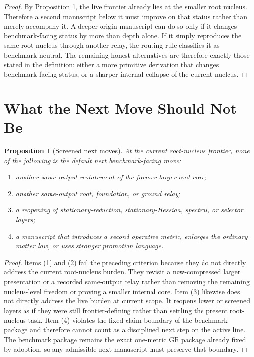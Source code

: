 \documentclass[11pt]{article}
\newtheorem{proposition}{Proposition}
\begin{document}
\begin{proof}
By Proposition 1, the live frontier already lies at the smaller root nucleus. Therefore a second manuscript below it must improve on that status rather than merely accompany it. A deeper-origin manuscript can do so only if it changes benchmark-facing status by more than depth alone. If it simply reproduces the same root nucleus through another relay, the routing rule classifies it as benchmark neutral. The remaining honest alternatives are therefore exactly those stated in the definition: either a more primitive derivation that changes benchmark-facing status, or a sharper internal collapse of the current nucleus.
\end{proof}

\section{What the Next Move Should Not Be}

\begin{proposition}[Screened next moves]
At the current root-nucleus frontier, none of the following is the default next benchmark-facing move:
\begin{enumerate}
    \item another same-output restatement of the former larger root core;
    \item another same-output root, foundation, or ground relay;
    \item a reopening of stationary-reduction, stationary-Hessian, spectral, or selector layers;
    \item a manuscript that introduces a second operative metric, enlarges the ordinary matter law, or uses stronger promotion language.
\end{enumerate}
\end{proposition}

\begin{proof}
Items (1) and (2) fail the preceding criterion because they do not directly address the current root-nucleus burden. They revisit a now-compressed larger presentation or a recorded same-output relay rather than removing the remaining nucleus-level freedom or proving a smaller internal core. Item (3) likewise does not directly address the live burden at current scope. It reopens lower or screened layers as if they were still frontier-defining rather than settling the present root-nucleus task. Item (4) violates the fixed claim boundary of the benchmark package and therefore cannot count as a disciplined next step on the active line. The benchmark package remains the exact one-metric GR package already fixed by adoption, so any admissible next manuscript must preserve that boundary.
\end{proof}
\end{document}
